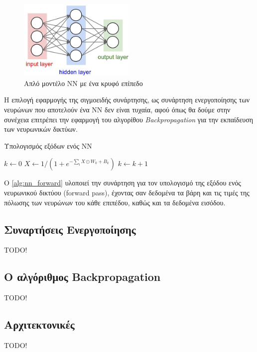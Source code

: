 \begin{figure}[!ht]
  \centering
  \includegraphics[width=0.5\textwidth]{./images/chapter3/simple_nn.jpg}
  \caption[Απλό μοντέλο NN με ένα κρυφό επίπεδο]{Απλό μοντέλο NN με ένα κρυφό επίπεδο}
  \label{fig:simple_nn}
\end{figure}

Η επιλογή εφαρμογής της σιγμοειδής συνάρτησης, ως συνάρτηση ενεργοποίησης των
νευρώνων που αποτελούν ένα ΝΝ δεν είναι τυχαία, αφού όπως θα δούμε στην
συνέχεια επιτρέπει την εφαρμογή του αλγορίθου \emph{Backpropagation} για την
εκπαίδευση των νευρωνικών δικτύων.

\begin{algorithm}[!htp]
  \caption{Υπολογισμός εξόδων ενός ΝΝ}
  \label{alg:nn_forward}
  \begin{algorithmic}[1]
      \State $k \gets 0$
        \State $X \gets 1 / (1 + e^{-\sum_{\imath} X \odot W_{k} + B_{k}})$
        \State $k \gets k+1$
      \EndWhile
    \EndProcedure
  \end{algorithmic}
\end{algorithm}

O \autoref{alg:nn_forward} υλοποιεί την συνάρτηση για τον υπολογισμό της εξόδου
ενός νευρωνικού δικτύου (forward pass), έχοντας σαν δεδομένα τα βάρη και τις τιμές της πόλωσης
των νευρώνων του κάθε επιπέδου, καθώς και τα δεδομένα εισόδου.


\subsection{Συναρτήσεις Ενεργοποίησης}

TODO!

\subsection{Ο αλγόριθμος Backpropagation}

TODO!

\subsection{Αρχιτεκτονικές}

TODO!
